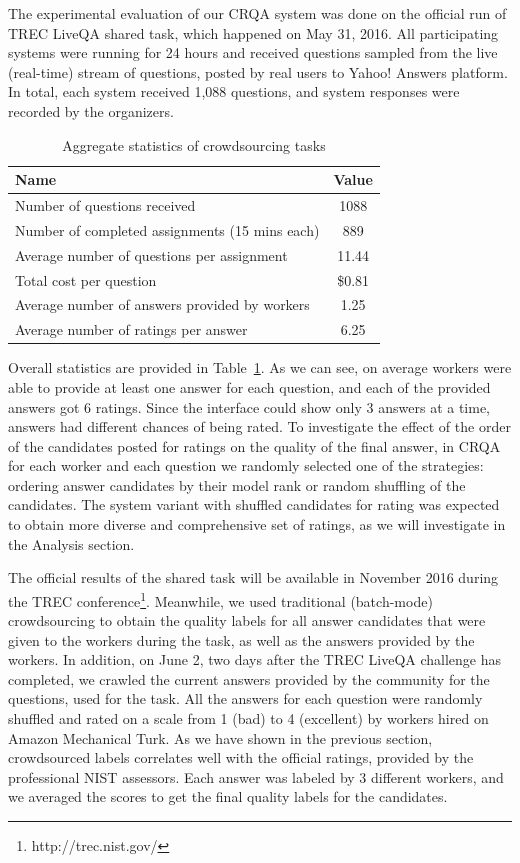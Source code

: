 The experimental evaluation of our CRQA system was done on the official run of TREC LiveQA shared task, which happened on May 31, 2016.
All participating systems were running for 24 hours and received questions sampled from the live (real-time) stream of questions, posted by real users to Yahoo! Answers platform.
In total, each system received 1,088 questions, and system responses were recorded by the organizers.

\begin{table}[ht]
\centering
\begin{tabular}{| p{14cm} | c | }
\hline
Name & Value \\
\hline
Number of questions received & 1088 \\
Number of completed assignments (15 mins each) & 889 \\
Average number of questions per assignment & 11.44 \\
Total cost per question & \$0.81 \\
Average number of answers provided by workers & 1.25 \\
Average number of ratings per answer & 6.25 \\
\hline
\end{tabular}
\caption{Aggregate statistics of crowdsourcing tasks}
\label{table:crowdsourcing:crqa:task_stats}
\end{table}

Overall statistics are provided in Table~\ref{table:crowdsourcing:crqa:task_stats}.
As we can see, on average workers were able to provide at least one answer for each question, and each of the provided answers got 6 ratings.
Since the interface could show only 3 answers at a time, answers had different chances of being rated.
To investigate the effect of the order of the candidates posted for ratings on the quality of the final answer, in CRQA for each worker and each question we randomly selected one of the strategies: ordering answer candidates by their model rank or random shuffling of the candidates.
The system variant with shuffled candidates for rating was expected to obtain more diverse and comprehensive set of ratings, as we will investigate in the Analysis section.

The official results of the shared task will be available in November 2016 during the TREC conference\footnote{http://trec.nist.gov/}.
Meanwhile, we used traditional (batch-mode) crowdsourcing to obtain the quality labels for all answer candidates that were given to the workers during the task, as well as the answers provided by the workers.
In addition, on June 2, two days after the TREC LiveQA challenge has completed, we crawled the current answers provided by the community for the questions, used for the task.
All the answers for each question were randomly shuffled and rated on a scale from 1 (bad) to 4 (excellent) by workers hired on Amazon Mechanical Turk.
As we have shown in the previous section, crowdsourced labels correlates well with the official ratings, provided by the professional NIST assessors.
Each answer was labeled by 3 different workers, and we averaged the scores to get the final quality labels for the candidates.


